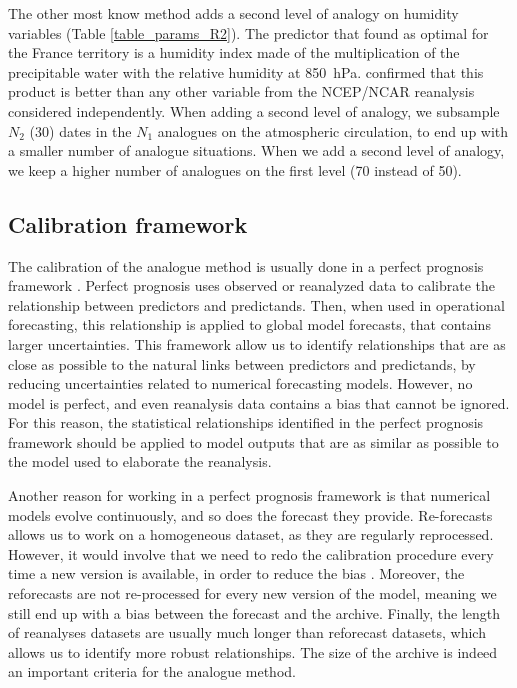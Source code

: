 \documentclass{ametsoc}
\begin{document}
The other most know method adds a second level of analogy on humidity variables (Table \ref{table_params_R2}). The predictor that \citet{Bontron2004} found as optimal for the France territory is a humidity index made of the multiplication of the precipitable water with the relative humidity at 850~hPa. \cite{Horton2012a} confirmed that this product is better than any other variable from the NCEP/NCAR reanalysis considered independently. When adding a second level of analogy, we subsample $N_{2}$ (30) dates in the $N_{1}$ analogues on the atmospheric circulation, to end up with a smaller number of analogue situations. When we add a second level of analogy, we keep a higher number of analogues on the first level (70 instead of 50).


\subsection{Calibration framework}

The calibration of the analogue method is usually done in a perfect prognosis \citep{Klein1959} framework \citep{BenDaoud2010, Bontron2004}. Perfect prognosis uses observed or reanalyzed data to calibrate the relationship between predictors and predictands. Then, when used in operational forecasting, this relationship is applied to global model forecasts, that contains larger uncertainties. This framework allow us to identify relationships that are as close as possible to the natural links between predictors and predictands, by reducing uncertainties related to numerical forecasting models. However, no model is perfect, and even reanalysis data contains a bias that cannot be ignored. For this reason, the statistical relationships identified in the perfect prognosis framework should be applied to model outputs that are as similar as possible to the model used to elaborate the reanalysis. 

Another reason for working in a perfect prognosis framework is that numerical models evolve continuously, and so does the forecast they provide. Re-forecasts allows us to work on a homogeneous dataset, as they are regularly reprocessed. However, it would involve that we need to redo the calibration procedure every time a new version is available, in order to reduce the bias \citep{Wilson2002}. Moreover, the reforecasts are not re-processed for every new version of the model, meaning we still end up with a bias between the forecast and the archive. Finally, the length of reanalyses datasets are usually much longer than reforecast datasets, which allows us to identify more robust relationships. The size of the archive is indeed an important criteria for the analogue method.
\end{document}
